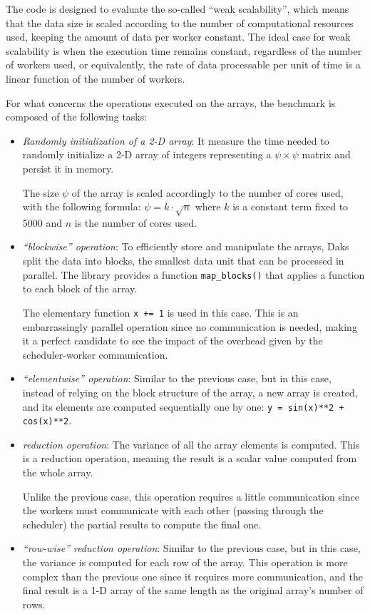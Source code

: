 The code is designed to evaluate the so-called ``weak scalability'', which means
that the data size is scaled according to the number of computational resources
used, keeping the amount of data per worker constant. The ideal case for weak
scalability is when the execution time remains constant, regardless of the
number of workers used, or equivalently, the rate of data processable per unit
of time is a linear function of the number of workers.

For what concerns the operations executed on the arrays, the benchmark is
composed of the following tasks:

\begin{itemize}
  \itemsep0em
  \item \textit{Randomly initialization of a 2-D array}: It measure the time
    needed to randomly initialize a 2-D array of integers representing a
    $\psi\times\psi$ matrix and persist it in memory.

    The size $\psi$ of the array is scaled accordingly to the number of cores
    used, with the following formula: $\psi = k \cdot \sqrt{n}$ where $k$ is a
    constant term fixed to 5000 and $n$ is the number of cores used.
  \item \textit{``blockwise'' operation}: To efficiently store and manipulate
    the arrays, Daks split the data into blocks, the smallest data unit that
    can be processed in parallel. The library provides a function
    \texttt{map\_blocks()} that applies a function to each block of the array.

    The elementary function \texttt{x += 1} is used in this case.
    This is an embarrassingly parallel operation since no communication is
    needed, making it a perfect candidate to see the impact of the overhead
    given by the scheduler-worker communication.
  \item \textit{``elementwise'' operation}: Similar to the previous case, but in
    this case, instead of relying on the block structure of the array, a new
    array is created, and its elements are computed sequentially one by one:
    \texttt{y = sin(x)**2 + cos(x)**2}.
  \item \textit{reduction operation}: The variance of all the array elements is
    computed. This is a reduction operation, meaning the result is a scalar
    value computed from the whole array.

    Unlike the previous case, this operation requires a little communication
    since the workers must communicate with each other (passing through the
    scheduler) the partial results to compute the final one.
 \item \textit{``row-wise'' reduction operation}: Similar to the previous case,
   but in this case, the variance is computed for each row of the array.
    This operation is more complex than the previous one since it requires more
    communication, and the final result is a 1-D array of the same length as the
    original array's number of rows.


\end{itemize}
